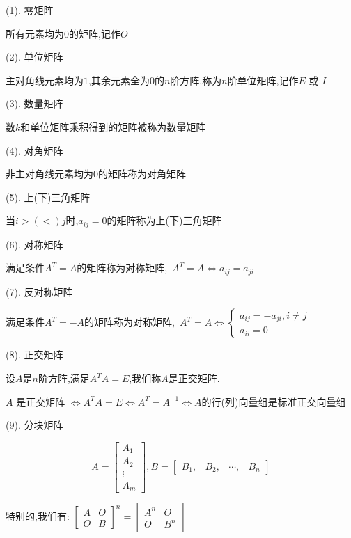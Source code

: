 \begin{definition}[重要矩阵]
	(1). 零矩阵
	
	所有元素均为$0$的矩阵,记作$O$
	
	(2). 单位矩阵
	
	主对角线元素均为$1$,其余元素全为$0$的$n$阶方阵,称为$n$阶单位矩阵,记作$E$ 或 $I$
	
	(3). 数量矩阵
	
	数$k$和单位矩阵乘积得到的矩阵被称为数量矩阵
	
	(4). 对角矩阵
	
	非主对角线元素均为$0$的矩阵称为对角矩阵
	
	(5). 上(下)三角矩阵
	
	当$i>(<)j$时,$a_{ij}=0$的矩阵称为上(下)三角矩阵
	
	(6). 对称矩阵
	
	满足条件$A^{T}=A$的矩阵称为对称矩阵,\ $A^{T}=A\Leftrightarrow a_{ij}=a_{ji}$
	
	(7). 反对称矩阵
	
	满足条件$A^{T}=-A$的矩阵称为对称矩阵,\ $A^{T}=A\Leftrightarrow \left\lbrace 
	\begin{array}{l}
		a_{ij}=-a_{ji},i\neq j\\
		a_{ii}=0
	\end{array}
	\right. $
	
	(8). 正交矩阵
	
	设$A$是$n$阶方阵,满足$A^{T}A=E$,我们称$A$是正交矩阵.
	
	$A$ 是正交矩阵 $\Leftrightarrow A^{T}A=E\Leftrightarrow A^{T}=A^{-1}\Leftrightarrow A $的行(列)向量组是标准正交向量组
	
	(9). 分块矩阵
	
	$$A=\left[
	\begin{matrix}
		A_{1}\\A_{2}\\ \vdots \\A_{m}
	\end{matrix}
	\right],B=\left[
	\begin{matrix}
		B_{1},&B_{2},&\cdots ,&B_{n}
	\end{matrix}
	\right]$$
	
	特别的,我们有:  $\left[ \begin{array}{ll}
		A&O\\O&B
	\end{array}\right]^{n}=\left[ \begin{array}{ll}
	A^n&O\\O&B^n
	\end{array}\right] $
\end{definition}

